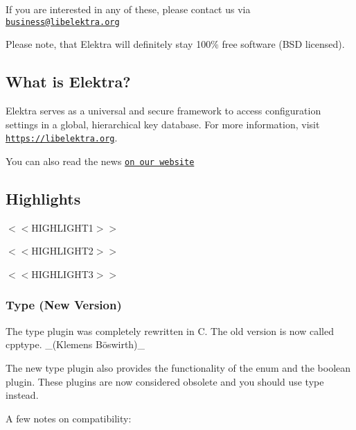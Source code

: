 If you are interested in any of these, please contact us via \href{mailto:business@libelektra.org}{\tt business@libelektra.\+org}

Please note, that Elektra will definitely stay 100\% free software (B\+SD licensed).

\subsection*{What is Elektra?}

Elektra serves as a universal and secure framework to access configuration settings in a global, hierarchical key database. For more information, visit \href{https://libelektra.org}{\tt https\+://libelektra.\+org}.

You can also read the news \href{https://www.libelektra.org/news/0.8.<<VERSION>>-release}{\tt on our website}

\subsection*{Highlights}


\begin{DoxyItemize}
\item $<$$<$\+H\+I\+G\+H\+L\+I\+G\+H\+T1$>$$>$
\item $<$$<$\+H\+I\+G\+H\+L\+I\+G\+H\+T2$>$$>$
\item $<$$<$\+H\+I\+G\+H\+L\+I\+G\+H\+T3$>$$>$
\end{DoxyItemize}

\subsubsection*{Type (New Version)}

The {\ttfamily type} plugin was completely rewritten in C. The old version is now called {\ttfamily cpptype}. \+\_\+(Klemens Böswirth)\+\_\+

The new {\ttfamily type} plugin also provides the functionality of the {\ttfamily enum} and the {\ttfamily boolean} plugin. These plugins are now considered obsolete and you should use {\ttfamily type} instead.

A few notes on compatibility\+:


